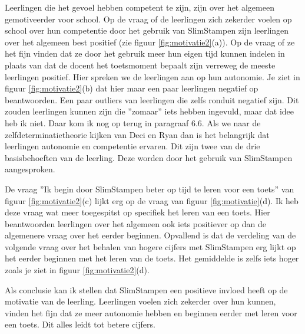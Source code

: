 \documentclass[12pt, a4paper]{article}
\begin{document}
Leerlingen die het gevoel hebben competent te zijn, zijn over het algemeen gemotiveerder voor school. Op de vraag of de leerlingen zich 
zekerder voelen op school over hun competentie door het gebruik van SlimStampen zijn leerlingen over het algemeen best positief 
(zie figuur \ref*{fig:motivatie2}(a)). Op de vraag of ze het fijn vinden dat ze door het gebruik meer hun eigen tijd kunnen indelen in plaats van dat de docent het toetsmoment bepaalt zijn verreweg de meeste leerlingen positief. Hier spreken we de leerlingen aan op hun autonomie. Je ziet in figuur \ref*{fig:motivatie2}(b) dat hier maar een paar leerlingen negatief op beantwoorden. Een paar outliers van leerlingen die zelfs ronduit negatief zijn. Dit zouden leerlingen kunnen zijn die ''zomaar'' iets hebben ingevuld, maar dat idee heb ik niet. Daar kom ik nog op terug in paragraaf 6.6. Als we naar de zelfdeterminatietheorie kijken van Deci en Ryan dan is het belangrijk dat leerlingen autonomie en competentie ervaren. Dit zijn twee van de drie basisbehoeften van de leerling. Deze worden door het gebruik van SlimStampen aangesproken.

De vraag ''Ik begin door SlimStampen beter op tijd te leren voor een toets'' van figuur \ref*{fig:motivatie2}(c) lijkt erg op de vraag van figuur \ref*{fig:motivatie}(d). Ik heb deze vraag wat meer toegespitst op specifiek het leren van een toets. Hier beantwoorden leerlingen over het algemeen ook iets positiever op dan de algemenere vraag over het eerder beginnen. Opvallend is dat de verdeling van de volgende vraag over het behalen van hogere cijfers met SlimStampen erg lijkt op het eerder beginnen met het leren van de toets. Het gemiddelde is zelfs iets hoger zoals je ziet in figuur \ref*{fig:motivatie2}(d).

Als conclusie kan ik stellen dat SlimStampen een positieve invloed heeft op de motivatie van de leerling. Leerlingen voelen zich zekerder over hun kunnen, vinden het fijn dat ze meer autonomie hebben en beginnen eerder met leren voor een toets. Dit alles leidt tot betere cijfers.
\end{document}
